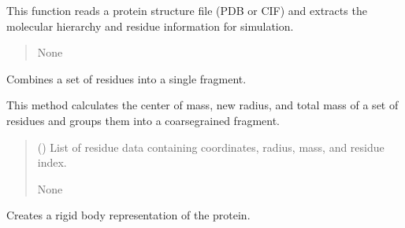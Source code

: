 \documentclass[letterpaper,10pt,english]{sphinxmanual}
\begin{document}
\begin{fulllineitems}
\begin{fulllineitems}
\sphinxAtStartPar
This function reads a protein structure file (PDB or CIF) and extracts
the molecular hierarchy and residue information for simulation.
\begin{quote}\begin{description}
\sphinxAtStartPar
{}

\sphinxAtStartPar
None

\end{description}\end{quote}

\end{fulllineitems}


\begin{fulllineitems}
\label{\detokenize{src:src.Protein_Class.ProteinStructure.combine_residues_to_fragment}}
\pysigstartsignatures
{}
\pysigstopsignatures
\sphinxAtStartPar
Combines a set of residues into a single fragment.

\sphinxAtStartPar
This method calculates the center of mass, new radius, and total mass
of a set of residues and groups them into a coarse\sphinxhyphen{}grained fragment.
\begin{quote}\begin{description}
\sphinxAtStartPar
{} () \textendash{} List of residue data containing coordinates, radius, mass, and residue index.

\sphinxAtStartPar
None

\end{description}\end{quote}

\end{fulllineitems}


\begin{fulllineitems}
\label{\detokenize{src:src.Protein_Class.ProteinStructure.create_rigid_body_protein}}
\pysigstartsignatures
{}
\pysigstopsignatures
\sphinxAtStartPar
Creates a rigid body representation of the protein.


\end{fulllineitems}
\end{fulllineitems}
\end{document}
